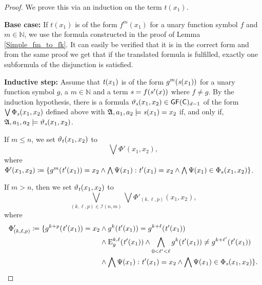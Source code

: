 \begin{proof}
	We prove this via an induction on the term $t(x_1)$.
	
	\textbf{Base case:}
	If $t(x_1)$ is of the form $f^{m}(x_1)$ for a unary function symbol $f$ and $m\in \mathbb N$, we use the formula constructed in the proof of Lemma \ref{Simple_fm_to_fk}.
	It can easily be verified that it is in the correct form and from the same proof we get that if the translated formula is fulfilled, exactly one subformula of the disjunction is satisfied.
	
	\textbf{Inductive step:}
	Assume that $\operatorname{\mathit{t}}(x_1)$ is of the form $g^m(\operatorname{\mathit{s}}(x_1))$ for a unary function symbol $g$, a $m\in\mathbb N$ and a term $\operatorname{\mathit{s}}=f(s'(x))$ where $f\neq g$.
	By the induction hypothesis, there is a formula $\vartheta_{\operatorname{\mathit{s}}}(x_1,x_2)\in \mathsf{GF}(\mathsf{C})_{d-1}$ of the form $\bigvee \Phi_{\operatorname{\mathit{s}}}(x_1,x_2)$ defined above with $\mathfrak A,a_1,a_2 \models \operatorname{\mathit{s}}(x_1)=x_2$ if, and only if, $\mathfrak A,a_1,a_2\models \vartheta_{\operatorname{\mathit{s}}}(x_1,x_2)$.
	
	If $m\leq n$, we set $\vartheta_{\operatorname{\mathit{t}}}(x_1,x_2)$ to
	$$\bigvee \Phi'(x_1,x_2),$$
	where $\Phi'(x_1,x_2)\coloneqq\{g^{m}(\operatorname{\mathit{t}}'(x_1))=x_2 \land \bigwedge \Psi(x_1) : \operatorname{\mathit{t}}'(x_1)=x_2 \land \bigwedge \Psi(x_1)\in \Phi_s(x_1,x_2)\}$.
	
	If $m>n$, then we set $\vartheta_{\operatorname{\mathit{t}}}(x_1,x_2)$ to
	$$\bigvee_{(k,\ell,p)\in \mathcal I(n,m)} \bigvee \Phi'_{(k,\ell,p)}(x_1,x_2),$$
	where 
	\begin{align*}
		\Phi'_{(k,\ell,p)}\coloneqq \{g^{k+p}(\operatorname{\mathit{t}}'(x_1))=x_2 &\land g^{k}(\operatorname{\mathit{t}}'(x_1))=g^{k+\ell}(\operatorname{\mathit{t}}'(x_1)) \\
		& \land \operatorname{E}^{k,\ell}_g(\operatorname{\mathit{t}}'(x_1)) \land \bigwedge_{0<\ell'<\ell} g^{k}(\operatorname{\mathit{t}}'(x_1))\neq g^{k+\ell'}(\operatorname{\mathit{t}}'(x_1)) \\
		& \land\bigwedge \Psi(x_1) : \operatorname{\mathit{t}}'(x_1)=x_2 \land \bigwedge \Psi(x_1)\in \Phi_{\operatorname{\mathit{s}}}(x_1,x_2)\}.
	\end{align*}
	

\end{proof}
